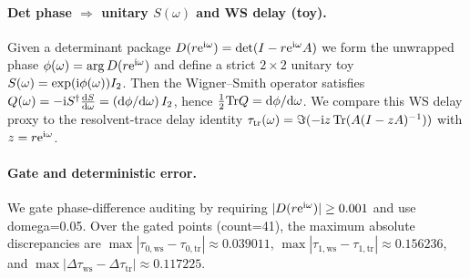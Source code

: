 \paragraph{Det phase $\Rightarrow$ unitary $S(\omega)$ and WS delay (toy).} \AuditTag Given a determinant package $D(r\mathrm{e}^{\mathrm{i}\omega})=\det(I-r\mathrm{e}^{\mathrm{i}\omega}A)$ we form the unwrapped phase $\phi(\omega)=\arg D(r\mathrm{e}^{\mathrm{i}\omega})$ and define a strict $2\times2$ unitary toy $S(\omega)=\exp(\mathrm{i}\phi(\omega))I_2$. Then the Wigner--Smith operator satisfies $Q(\omega)=-\mathrm{i} S^\dagger \frac{\mathrm{d} S}{\mathrm{d}\omega}=(\mathrm{d}\phi/\mathrm{d}\omega)\,I_2$, hence $\tfrac12\mathrm{Tr} Q=\mathrm{d}\phi/\mathrm{d}\omega$. We compare this WS delay proxy to the resolvent-trace delay identity $\tau_{\mathrm{tr}}(\omega)=\Im(-\mathrm{i} z\,\mathrm{Tr}(A(I-zA)^{-1}))$ with $z=r\mathrm{e}^{\mathrm{i}\omega}$.
\paragraph{Gate and deterministic error.} \AuditTag We gate phase-difference auditing by requiring $|D(r\mathrm{e}^{\mathrm{i}\omega})|\ge 0.001$ and use domega=0.05. Over the gated points (count=41), the maximum absolute discrepancies are $\max|\tau_{0,\mathrm{ws}}-\tau_{0,\mathrm{tr}}|\approx0.039011$, $\max|\tau_{1,\mathrm{ws}}-\tau_{1,\mathrm{tr}}|\approx0.156236$, and $\max|\Delta\tau_{\mathrm{ws}}-\Delta\tau_{\mathrm{tr}}|\approx0.117225$.